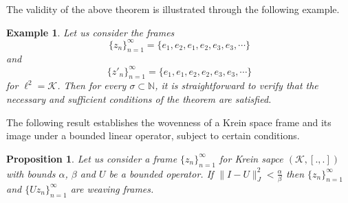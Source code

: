 \documentclass[article,12pt]{amsart}
\newtheorem{prop}[thm]{Proposition}
\newtheorem{ex}[thm]{Example}
\begin{document}
The validity of the above theorem is illustrated through the following example.

\begin{ex}
Let us consider the frames 
$$
\{z_n\}_{n=1}^\infty=\{e_1, e_2, e_1, e_2, e_3, e_3, \cdots\}
$$ and 
$$
\{z'_n\}_{n=1}^\infty=\{e_1, e_1, e_2, e_2, e_3, e_3, \cdots\}
$$ for $\ell^2=\mathcal K$. Then for every $\sigma \subset \mathbb{N}$, it is straightforward to verify that the necessary and sufficient conditions of the theorem are satisfied.
\end{ex}


The following result establishes the wovenness of a Krein space frame and its image under a bounded linear operator, subject to certain conditions.
 
 \begin{prop} \label{2.8}
Let us consider a frame $\{z_n\}_{n=1}^\infty$  for Krein sapce $(\mathcal K, [.,.])$ with bounds  $\alpha$,  $\beta$ and $U$ be a bounded operator. If  $\|I - U\|_{J}^2 < \frac{\alpha}{\beta}$ then $\{z_n\}_{n=1}^\infty$ and $\{Uz_n\}_{n=1}^\infty$ are weaving frames.
\end{prop}
 
\end{document}
